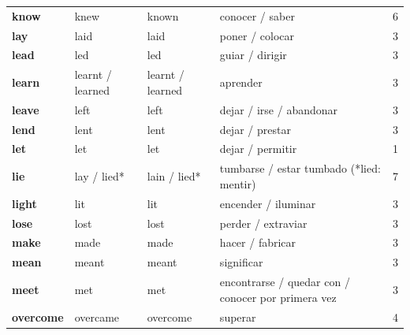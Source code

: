 \documentclass[11pt,a4paper]{article}
\begin{document}
\begin{longtable}{>{\bfseries}p{2.6cm}p{3.4cm}p{3.6cm}>{\raggedright\arraybackslash}p{6.0cm}c}
\textcolor{rosaO}{know} & \textcolor{rosaO}{knew} & \textcolor{rosaO}{known} & \textcolor{rosaO}{conocer / saber} & \textcolor{rosaO}{6}\\
\textcolor{verdeO}{lay} & \textcolor{verdeO}{laid} & \textcolor{verdeO}{laid} & \textcolor{verdeO}{poner / colocar} & \textcolor{verdeO}{3}\\
\textcolor{verdeO}{lead} & \textcolor{verdeO}{led} & \textcolor{verdeO}{led} & \textcolor{verdeO}{guiar / dirigir} & \textcolor{verdeO}{3}\\
\textcolor{verdeO}{learn} & \textcolor{verdeO}{learnt / learned} & \textcolor{verdeO}{learnt / learned} & \textcolor{verdeO}{aprender} & \textcolor{verdeO}{3}\\
\textcolor{verdeO}{leave} & \textcolor{verdeO}{left} & \textcolor{verdeO}{left} & \textcolor{verdeO}{dejar / irse / abandonar} & \textcolor{verdeO}{3}\\
\textcolor{verdeO}{lend} & \textcolor{verdeO}{lent} & \textcolor{verdeO}{lent} & \textcolor{verdeO}{dejar / prestar} & \textcolor{verdeO}{3}\\
\textcolor{amarilloO}{let} & \textcolor{amarilloO}{let} & \textcolor{amarilloO}{let} & \textcolor{amarilloO}{dejar / permitir} & \textcolor{amarilloO}{1}\\
\textcolor{azulO}{lie} & \textcolor{azulO}{lay / lied*} & \textcolor{azulO}{lain / lied*} & \textcolor{azulO}{tumbarse / estar tumbado (*lied: mentir)} & \textcolor{azulO}{7}\\
\textcolor{verdeO}{light} & \textcolor{verdeO}{lit} & \textcolor{verdeO}{lit} & \textcolor{verdeO}{encender / iluminar} & \textcolor{verdeO}{3}\\
\textcolor{verdeO}{lose} & \textcolor{verdeO}{lost} & \textcolor{verdeO}{lost} & \textcolor{verdeO}{perder / extraviar} & \textcolor{verdeO}{3}\\
\textcolor{verdeO}{make} & \textcolor{verdeO}{made} & \textcolor{verdeO}{made} & \textcolor{verdeO}{hacer / fabricar} & \textcolor{verdeO}{3}\\
\textcolor{verdeO}{mean} & \textcolor{verdeO}{meant} & \textcolor{verdeO}{meant} & \textcolor{verdeO}{significar} & \textcolor{verdeO}{3}\\
\textcolor{verdeO}{meet} & \textcolor{verdeO}{met} & \textcolor{verdeO}{met} & \textcolor{verdeO}{encontrarse / quedar con / conocer por primera vez} & \textcolor{verdeO}{3}\\
\textcolor{moradoO}{overcome} & \textcolor{moradoO}{overcame} & \textcolor{moradoO}{overcome} & \textcolor{moradoO}{superar} & \textcolor{moradoO}{4}\\

\end{longtable}
\end{document}
